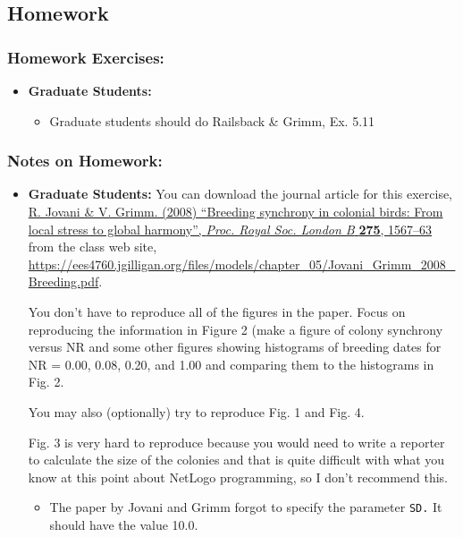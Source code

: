 \documentclass[
]{article}
\providecommand{\tightlist}{%
  \setlength{\itemsep}{0pt}\setlength{\parskip}{0pt}}
\begin{document}
\hypertarget{homework-5}{%
\subsection{Homework}\label{homework-5}}

\hypertarget{homework-exercises-5}{%
\subsubsection{Homework Exercises:}\label{homework-exercises-5}}

\begin{itemize}
\tightlist
\item
  \textbf{Graduate Students:}

  \begin{itemize}
  \tightlist
  \item
    Graduate students should do Railsback \& Grimm, Ex. 5.11
  \end{itemize}
\end{itemize}

\hypertarget{notes-on-homework-3}{%
\subsubsection{Notes on Homework:}\label{notes-on-homework-3}}

\begin{itemize}
\item
  \textbf{Graduate Students:} You can download the journal article for
  this exercise,
  \href{/files/models/chapter_05/Jovani_Grimm_2008_Breeding.pdf}{R.
  Jovani \& V. Grimm. (2008) ``Breeding synchrony in colonial birds:
  From local stress to global harmony'', \emph{Proc. Royal Soc. London
  B} \textbf{275}, 1567--63} from the class web site,
  \url{https://ees4760.jgilligan.org/files/models/chapter_05/Jovani_Grimm_2008_Breeding.pdf}.

  You don't have to reproduce all of the figures in the paper. Focus on
  reproducing the information in Figure 2 (make a figure of colony
  synchrony versus NR and some other figures showing histograms of
  breeding dates for NR = 0.00, 0.08, 0.20, and 1.00 and comparing them
  to the histograms in Fig. 2.

  You may also (optionally) try to reproduce Fig. 1 and Fig. 4.

  Fig. 3 is very hard to reproduce because you would need to write a
  reporter to calculate the size of the colonies and that is quite
  difficult with what you know at this point about NetLogo programming,
  so I don't recommend this.

  \begin{itemize}
  \tightlist
  \item
    The paper by Jovani and Grimm forgot to specify the parameter
    \texttt{SD.} It should have the value 10.0.
  \end{itemize}
\end{itemize}
\end{document}
